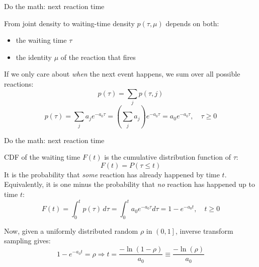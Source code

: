 \documentclass[presentation]{beamer}
\begin{document}
\begin{frame}{Do the math: next reaction time}
\small
\begin{block}{From joint density to waiting-time density}
$p(\tau,\mu)$ depends on both:
\begin{itemize}
 \item the waiting time $\tau$
 \item the identity $\mu$ of the reaction that fires
\end{itemize}
If we only care about \emph{when} the next event happens, we sum over all possible reactions:
$$p(\tau) = \sum_j p(\tau,j)$$
$$p(\tau) = \sum_j a_j e^{-a_0\tau} = \left(\sum_j a_j\right)e^{-a_0\tau} = a_0 e^{-a_0\tau}, \quad \tau \geq 0$$
\end{block}
\end{frame}

\begin{frame}{Do the math: next reaction time}
\small
\begin{block}{CDF of the waiting time}
$F(t)$ is the cumulative distribution function of $\tau$:
$$F(t) = P(\tau \leq t)$$
It is the probability that \emph{some} reaction has already happened by time $t$.
Equivalently, it is one minus the probability that \emph{no} reaction has happened up to time $t$:
$$F(t) = \int_0^t p(\tau)\,d\tau = \int_0^t a_0 e^{-a_0 \tau} d\tau = 1 - e^{-a_0 t}, \quad t \geq 0$$
\end{block}
Now, given a uniformly distributed random $\rho$ in $\left(0,1\right]$, inverse transform sampling gives:
$$ 1 - e^{-a_0 t} = \rho \Rightarrow t = \frac{-\ln \left( 1 - \rho \right)}{a_0} \equiv \frac{-\ln \left(\rho \right)}{a_0}$$
\end{frame}
\end{document}
